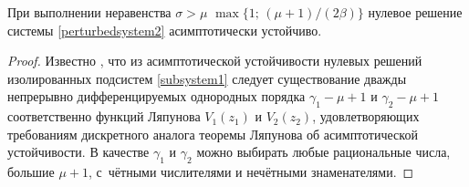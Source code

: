 \smallskip

\begin{theorem}[3] При выполнении неравенства $
\sigma>\mu$ $\max \{1;\, (\mu+1)/(2\beta)\} $
нулевое решение системы \eqref{perturbedsystem2}  асимптотически устойчиво\rm .
\end{theorem}

\smallskip

\begin{proof} Известно \cite{sultan:bib13}, что из асимптотической устойчивости нулевых решений
изолированных подсистем \eqref{subsystem1} следует существование дважды непрерывно
дифференцируемых однородных порядка $\gamma_1-\mu+1$ и
$\gamma_2-\mu+1$ соответственно функций Ляпунова $V_1(z_1)$ и $V_2(z_2)$, удовлетворяющих
требованиям дискретного аналога теоремы Ляпунова об асимптотической устойчивости. В
качестве $\gamma_1$ и $\gamma_2$ можно выбирать любые рациональные
числа, большие $\mu+1$, с~чётными числителями и нечётными знаменателями.


\end{proof}
